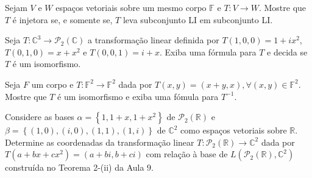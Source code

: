 \begin{questions}
	Sejam $V$ e $W$ espaços vetoriais sobre um mesmo corpo $\mathbb{F}$
	e $T\colon V\to W$.
	Mostre que $T$ é injetora se, e somente se, $T$ leva subconjunto LI
	em subconjunto LI.

	\begin{solutionordottedlines}
	\end{solutionordottedlines}

	\question\label{exercício:2.11}

	Seja
	$T\colon\mathbb{C}^{3}\to\mathcal{P}_{2}\left(\mathbb{C}\right)$
	a transformação linear definida por
	$T\left(1,0,0\right)=1+ix^{2}$,
	$T\left(0,1,0\right)=x+x^{2}$ e
	$T\left(0,0,1\right)=i+x$.
	Exiba uma fórmula para $T$ e decida se $T$ é um isomorfismo.

	\begin{solutionordottedlines}
	\end{solutionordottedlines}

	\question\label{exercício:2.12}

	Seja $F$ um corpo e $T\colon\mathbb{F}^{2}\to\mathbb{F}^{2}$ dada
	por
	\begin{math}
		T\left(x,y\right)=
		\left(x+y,x\right),
		\forall\left(x,y\right)\in
		\mathbb{F}^{2}
	\end{math}.
	Mostre que $T$ é um isomorfismo e exiba uma fómula para $T^{-1}$.

	\begin{solutionordottedlines}
	\end{solutionordottedlines}

	\question\label{exercício:2.13}

	Considere as bases $\alpha=\left\{1,1+x,1+x^{2}\right\}$ de
	$\mathcal{P}_{2}\left(\mathbb{R}\right)$ e
	\begin{math}
		\beta=
		\left\{
		\left(1,0\right),
		\left(i,0\right),
		\left(1,1\right),
		\left(1,i\right)
		\right\}
	\end{math}
	de $\mathbb{C}^{2}$ como espaços vetoriais sobre $\mathbb{R}$.
	Determine as coordenadas da transformação linear
	$T\colon\mathcal{P}_{2}\left(\mathbb{R}\right)\to\mathbb{C}^{2}$ dada
	por $T\left(a+bx+cx^{2}\right)=\left(a+bi,b+ci\right)$ com relação
	à base de
	\begin{math}
		L
		\left(
		\mathcal{P}_{2}\left(\mathbb{R}\right),
		\mathbb{C}^{2}
		\right)
	\end{math}
	construída no Teorema 2-(ii) da Aula $9$.

	\begin{solutionordottedlines}
	\end{solutionordottedlines}


\end{questions}
